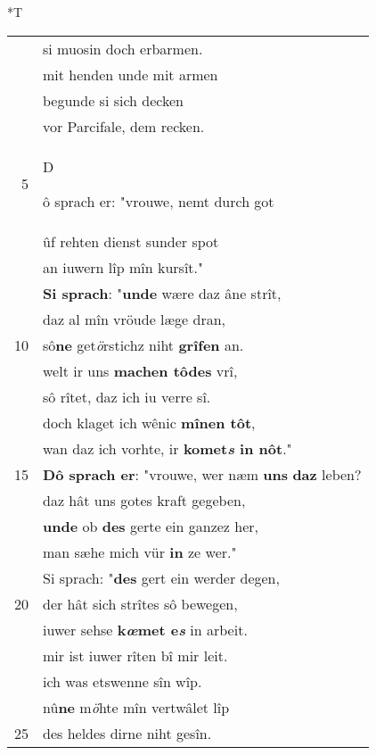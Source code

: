 \documentclass[8pt,a4paper,notitlepage]{article}
\begin{document}
\begin{table}[ht]
\begin{minipage}[t]{0.5\linewidth}
\end{minipage}
\hspace{0.5cm}
\begin{minipage}[t]{0.5\linewidth}
\small
\begin{center}*T
\end{center}
\begin{tabular}{rl}
 & si muosin doch erbarmen.\\ 
 & mit henden unde mit armen\\ 
 & begunde si sich decken\\ 
 & vor Parcifale, dem recken.\\ 
5 & \begin{large}D\end{large}ô sprach er: "vrouwe, nemt durch got\\ 
 & ûf rehten dienst sunder spot\\ 
 & an iuwern lîp mîn kursît."\\ 
 & \textbf{Si sprach}: "\textbf{unde} wære daz âne strît,\\ 
 & daz al mîn vröude læge dran,\\ 
10 & sô\textbf{ne} get\textit{ö}rstichz niht \textbf{grîfen} an.\\ 
 & welt ir uns \textbf{machen tôdes} vrî,\\ 
 & sô rîtet, daz ich iu verre sî.\\ 
 & doch klaget ich wênic \textbf{mînen tôt},\\ 
 & wan daz ich vorhte, ir \textbf{komet\textit{s} in nôt}."\\ 
15 & \textbf{Dô sprach er}: "vrouwe, wer næm \textbf{uns} \textbf{daz} leben?\\ 
 & daz hât uns gotes kraft gegeben,\\ 
 & \textbf{unde} ob \textbf{des} gerte ein ganzez her,\\ 
 & man sæhe mich vür \textbf{in} ze wer."\\ 
 & Si sprach: "\textbf{des} gert ein werder degen,\\ 
20 & der hât sich strîtes sô bewegen,\\ 
 & iuwer sehse \textbf{k\textit{œ}met e\textit{s}} in arbeit.\\ 
 & mir ist iuwer rîten bî mir leit.\\ 
 & ich was etswenne sîn wîp.\\ 
 & nû\textbf{ne} m\textit{ö}hte mîn vertwâlet lîp\\ 
25 & des heldes dirne niht gesîn.\\ 

\end{tabular}
\end{minipage}
\end{table}
\end{document}
